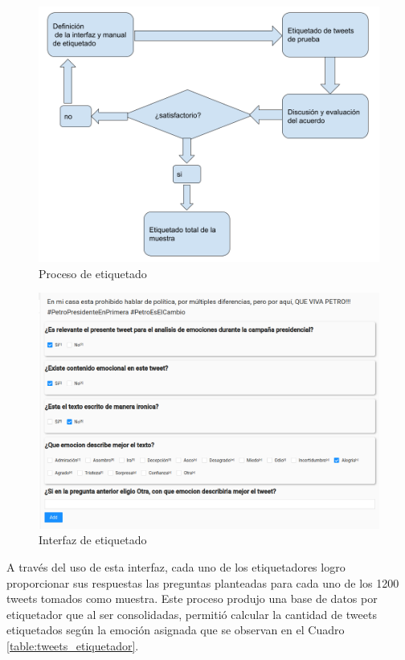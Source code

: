 \begin{figure}[!htbp]
	\centering
	\includegraphics[scale=0.35]{Images & Logos/Diagrama.png}
	\caption{Proceso de etiquetado} 
	\label{figure:diagrama}
\end{figure}

\begin{figure}[!htbp]
	\centering
	\includegraphics[scale=0.45]{Images & Logos/interfaz.png}
	\caption{Interfaz de etiquetado} 
	\label{figure:interfaz}
\end{figure}


A través del uso de esta interfaz, cada uno de los etiquetadores logro proporcionar sus respuestas las preguntas planteadas para cada uno de los 1200 tweets tomados como muestra. Este proceso produjo una base de datos por etiquetador que al ser consolidadas, permitió calcular la cantidad de tweets etiquetados según la emoción asignada que se observan en el Cuadro \ref{table:tweets_etiquetador}.



